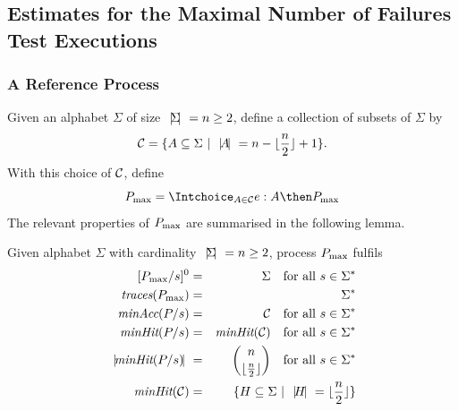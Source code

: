 \subsection{Estimates for the Maximal Number of Failures Test Executions}


\subsubsection*{A Reference Process}
Given an alphabet $\Sigma$ of size ${~|\! \Sigma\!|~} = n\ge 2$, define
a collection of subsets of $\Sigma$ by
\begin{equation}\label{eq:defC}
{\cal C} = \{ A\subseteq\Sigma~|~{~|\! A\!|~} = n - \lfloor\frac{n}{2}\rfloor + 1 \}.
\end{equation}
%
With this choice of ${\cal C}$, define
\begin{equation}\label{eq:pmax}
\pmax = \Intchoice_{A\in{\cal C}} e:A\then \pmax
\end{equation}
%
The relevant properties of $P_\text{max}$ are summarised in the following lemma.
%
\begin{lemma}\label{lemma:pmax}
Given alphabet $\Sigma$ with cardinality ${~|\! \Sigma\!|~} = n\ge 2$,
process $P_\text{max}$ fulfils
%
\begin{eqnarray}
{}[P_\text{max}/s]^0 & = & \Sigma \quad\text{for all $s\in \Sigma^*$}
\label{eq:pmaxa}
\\
\text{\it traces}(P_\text{max}) & = & \Sigma^*
\label{eq:pmaxb}
\\
\text{\it minAcc}(P/s) & = & {\cal C} \quad\text{for all $s\in \Sigma^*$}
\label{eq:pmaxc}
\\
\text{\it minHit}(P/s) & = & \text{\it minHit}({\cal C}) \quad\text{for all $s\in \Sigma^*$}
\label{eq:pmaxe}
\\
{~|\! \text{\it minHit}(P/s)\!|~} & = & \binom{n}{\lfloor\frac{n}{2}\rfloor} 
\quad \text{for all $s\in \Sigma^*$}
\label{eq:pmaxd}
\\
\text{\it minHit}({\cal C})  & = & \{ H\subseteq \Sigma~|~{~|\! H\!|~} = \lfloor\frac{n}{2}\rfloor\}
\label{eq:pmaxf}
\end{eqnarray}
\end{lemma}
